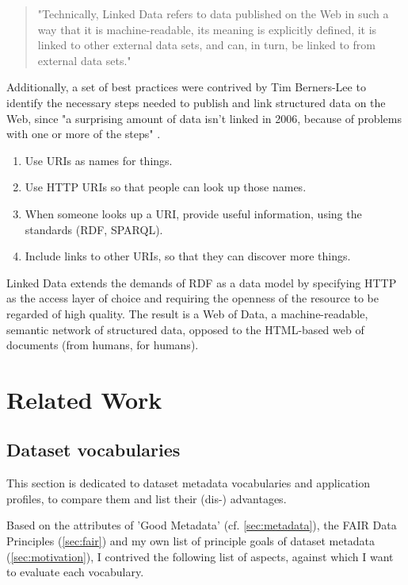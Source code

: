 \documentclass[a4paper,english,twoside,BCOR1.5cm,headsepline,DIV12,appendixprefix,final,12pt]{scrbook}
\begin{document}
\begin{quote}
"Technically, Linked Data refers to data published on the Web in such a way that it is
machine-readable, its meaning is explicitly defined, it is linked to other external data sets,
and can, in turn, be linked to from external data sets." \cite{bizer_linked_2009}
\end{quote}

Additionally, a set of best practices were contrived by Tim Berners-Lee to identify the necessary steps needed to publish and link structured data on the Web, since "a surprising amount of data isn't linked in 2006, because of problems with one or more of the steps" \cite{5starData}.

\begin{enumerate}
\item Use URIs as names for things.
\item Use HTTP URIs so that people can look up those names.
\item When someone looks up a URI, provide useful information, using the standards (RDF, SPARQL).
\item Include links to other URIs, so that they can discover more things.
\end{enumerate}

Linked Data extends the demands of RDF as a data model by specifying HTTP as the access
layer of choice and requiring the openness of the resource to be regarded of high quality. 
The result is a Web of Data, a machine-readable, semantic network of structured data, 
opposed to the HTML-based web of documents (from humans, for humans).

\chapter{Related Work}
\label{chap:relatedwork}

\section{Dataset vocabularies}
\label{sec:dv}
This section is dedicated to dataset metadata vocabularies and application profiles, to compare them and list their (dis-) advantages.

Based on the attributes of 'Good Metadata' (cf. \cref{sec:metadata}), the FAIR Data Principles (\cref{sec:fair}) and my own list of principle goals of dataset metadata (\cref{sec:motivation}), I contrived the following list of aspects, against which I want to evaluate each vocabulary.
\end{document}
